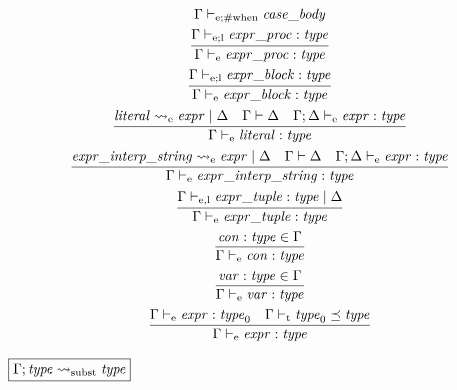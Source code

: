 \begin{gather*}
{        \Gamma \vdash_{\mathrm{e}; \mathrm{\#when}} \mathit{case\_body}
    }
    \\
    \infer{\Gamma \vdash_\mathrm{e} \mathit{expr\_proc}: \mathit{type}}{
        \Gamma \vdash_{\mathrm{e}; \mathrm{l}} \mathit{expr\_proc}: \mathit{type}
    }
    \\
    \infer{\Gamma \vdash_\mathrm{e} \mathit{expr\_block}: \mathit{type}}{
        \Gamma \vdash_{\mathrm{e}; \mathrm{l}} \mathit{expr\_block}: \mathit{type}
    }
    \\
    \infer{\Gamma \vdash_\mathrm{e} \mathit{literal}: \mathit{type}}{
        \mathit{literal} \rightsquigarrow_\mathrm{e} \mathit{expr} \mid \Delta
        &
        \Gamma \vdash \Delta
        &
        \Gamma; \Delta \vdash_\mathrm{e} \mathit{expr}: \mathit{type}
    }
    \\
    \infer{\Gamma \vdash_\mathrm{e} \mathit{expr\_interp\_string}: \mathit{type}}{
        \mathit{expr\_interp\_string} \rightsquigarrow_\mathrm{e} \mathit{expr} \mid \Delta
        &
        \Gamma \vdash \Delta
        &
        \Gamma; \Delta \vdash_\mathrm{e} \mathit{expr}: \mathit{type}
    }
    \\
    \infer{\Gamma \vdash_\mathrm{e} \mathit{expr\_tuple}: \mathit{type}}{
        \Gamma \vdash_{\mathrm{e}, \mathrm{l}} \mathit{expr\_tuple}: \mathit{type} \mid \Delta
    }
    \\
    \infer{\Gamma \vdash_\mathrm{e} \mathit{con}: \mathit{type}}{
        \mathit{con}: \mathit{type} \in \Gamma
    }
    \\
    \infer{\Gamma \vdash_\mathrm{e} \mathit{var}: \mathit{type}}{
        \mathit{var}: \mathit{type} \in \Gamma
    }
    \\
    \infer{\Gamma \vdash_\mathrm{e} \mathit{expr}: \mathit{type}}{
        \Gamma \vdash_\mathrm{e} \mathit{expr}: \mathit{type}_0
        &
        \Gamma \vdash_\mathrm{t} \mathit{type}_0 \preceq \mathit{type}
    }
\end{gather*}

$\fbox{$\Gamma; \mathit{type} \rightsquigarrow_\mathrm{subst} \mathit{type}$}$

